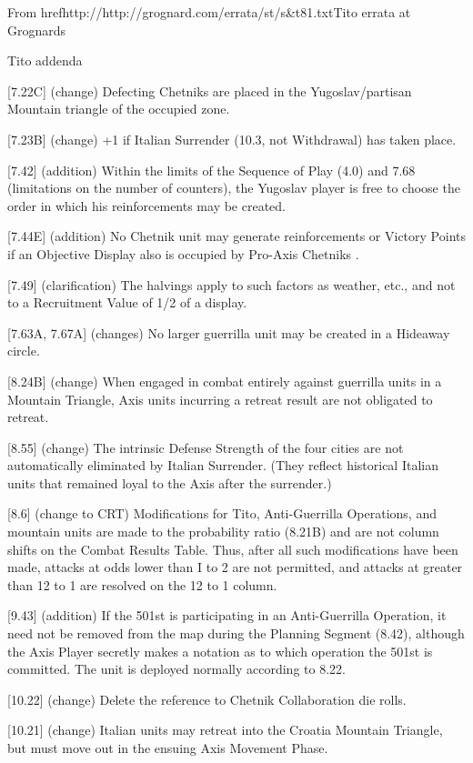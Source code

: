 
From href{http://http://grognard.com/errata/st/s&t81.txt}{Tito errata at Grognards}

Tito addenda

[7.22C] (change) Defecting Chetniks are placed in the
Yugoslav/partisan Mountain triangle of the occupied zone.

[7.23B] (change) +1 if Italian Surrender (10.3, not Withdrawal)
has taken place.

[7.42] (addition) Within the limits of the Sequence of Play
(4.0) and 7.68 (limitations on the number of counters), the
Yugoslav player is free to choose the order in which his
reinforcements may be created.

[7.44E] (addition) No Chetnik unit may generate reinforcements or
Victory Points if an Objective Display also is occupied by
Pro-Axis Chetniks .

[7.49] (clarification) The halvings apply to such factors as
weather, etc., and not to a Recruitment Value of 1/2 of a
display.

[7.63A, 7.67A] (changes) No larger guerrilla unit may be created
in a Hideaway circle.

[8.24B] (change) When engaged in combat entirely against
guerrilla units in a Mountain Triangle, Axis units incurring a
retreat result are not obligated to retreat.

[8.55] (change) The intrinsic Defense Strength of the four cities
are not automatically eliminated by Italian Surrender. (They
reflect historical Italian units that remained loyal to the Axis
after the surrender.)

[8.6] (change to CRT) Modifications for Tito, Anti-Guerrilla
Operations, and mountain units are made to the probability ratio
(8.21B) and are not column shifts on the Combat Results Table.
Thus, after all such modifications have been made, attacks at
odds lower than I to 2 are not permitted, and attacks at greater
than 12 to 1 are resolved on the 12 to 1 column.

[9.43] (addition) If the 501st is participating in an
Anti-Guerrilla Operation, it need not be removed from the map
during the Planning Segment (8.42), although the Axis Player
secretly makes a notation as to which operation the 501st is
committed. The unit is deployed normally according to 8.22.

[10.22] (change) Delete the reference to Chetnik Collaboration
die rolls.

[10.21] (change) Italian units may retreat into the Croatia
Mountain Triangle, but must move out in the ensuing Axis Movement
Phase.

